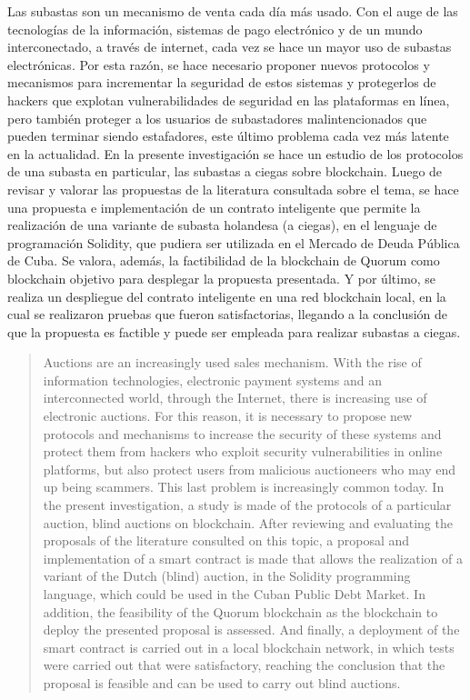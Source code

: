 \begin{resumen}
	Las subastas son un mecanismo de venta cada día más usado. Con el auge de las tecnologías de la información, sistemas de pago electrónico y de un mundo interconectado, a través de internet, cada vez se hace un mayor uso de subastas electrónicas. Por esta razón, se hace necesario proponer nuevos protocolos y mecanismos para incrementar la seguridad de estos sistemas y protegerlos de hackers que explotan vulnerabilidades de seguridad en las plataformas en línea, pero también proteger a los usuarios de subastadores malintencionados que pueden terminar siendo estafadores, este último problema cada vez más latente en la actualidad. En la presente investigación se hace un estudio de los protocolos de una subasta en particular, las subastas a ciegas sobre blockchain. Luego de revisar y valorar las propuestas de la literatura consultada sobre el tema, se hace una propuesta e implementación de un contrato inteligente que permite la realización de una variante de subasta holandesa (a ciegas), en el lenguaje de programación Solidity, que pudiera ser utilizada en el Mercado de Deuda Pública de Cuba. Se valora, además, la factibilidad de la blockchain de Quorum como blockchain objetivo para desplegar la propuesta presentada. Y por último, se realiza un despliegue del contrato inteligente en una red blockchain local, en la cual se realizaron pruebas que fueron satisfactorias, llegando a la conclusión de que la propuesta es factible y puede ser empleada para realizar subastas a ciegas.

\end{resumen}

\begin{abstract}
	Auctions are an increasingly used sales mechanism. With the rise of information technologies, electronic payment systems and an interconnected world, through the Internet, there is increasing use of electronic auctions. For this reason, it is necessary to propose new protocols and mechanisms to increase the security of these systems and protect them from hackers who exploit security vulnerabilities in online platforms, but also protect users from malicious auctioneers who may end up being scammers. This last problem is increasingly common today. In the present investigation, a study is made of the protocols of a particular auction, blind auctions on blockchain. After reviewing and evaluating the proposals of the literature consulted on this topic, a proposal and implementation of a smart contract is made that allows the realization of a variant of the Dutch (blind) auction, in the Solidity programming language, which could be used in the Cuban Public Debt Market. In addition, the feasibility of the Quorum blockchain as the blockchain to deploy the presented proposal is assessed. And finally, a deployment of the smart contract is carried out in a local blockchain network, in which tests were carried out that were satisfactory, reaching the conclusion that the proposal is feasible and can be used to carry out blind auctions.
\end{abstract}

